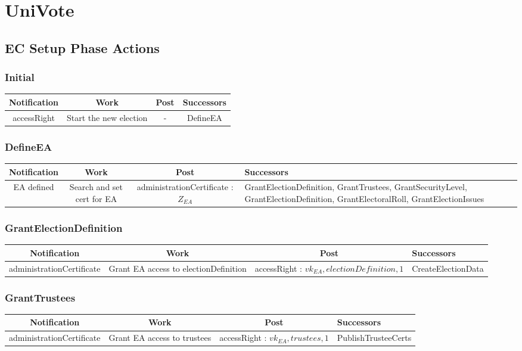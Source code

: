 \documentclass[bibtotoc,halfparskip,oneside]{scrreprt}
\begin{document}
	
	\chapter{UniVote}
	
	
	\begin{landscape}
		\section{EC Setup Phase Actions}
		\subsection{Initial}
		\begin{tabular}{|c|c|c|c|}
			\hline Notification & Work & Post & Successors\\ 
			\hline accessRight & Start the new election & -  & DefineEA \\  
			\hline 
		\end{tabular} 
		\subsection{DefineEA}
		\begin{tabularx}{\linewidth}{|c|c|c|X|}
			\hline Notification & Work & Post & Successors\\ 
			\hline EA defined & Search and set cert for EA & administrationCertificate : $Z_{EA}$ & GrantElectionDefinition, GrantTrustees, GrantSecurityLevel, GrantElectionDefinition, GrantElectoralRoll, GrantElectionIssues \\ 
			\hline 
		\end{tabularx} 
		\subsection{GrantElectionDefinition}
		\begin{tabularx}{\linewidth}{|c|c|c|X|}
			\hline Notification & Work & Post & Successors\\ 
			\hline administrationCertificate & Grant EA access to electionDefinition & accessRight : $vk_{EA} , electionDefinition  ,1 $ & CreateElectionData \\ 
			\hline 
		\end{tabularx}
		\subsection{GrantTrustees}
		\begin{tabularx}{\linewidth}{|c|c|c|X|}
			\hline Notification & Work & Post & Successors\\ 
			\hline administrationCertificate & Grant EA access to trustees & accessRight : $vk_{EA} , trustees, 1 $ & PublishTrusteeCerts \\  
			\hline 
		\end{tabularx}
		

\end{landscape}
\end{document}
